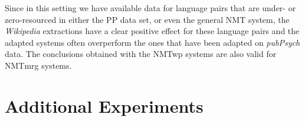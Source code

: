 \documentclass[a4paper,11pt]{article}
\begin{document}
Since in this setting we have available data for language pairs that are under- or zero-resourced in either the PP data set, or even the general NMT system, the \textit{Wikipedia} extractions have a clear positive effect for these language pairs and the adapted systems often overperform the ones that have been adapted on \textit{pubPsych} data. The conclusions obtained with the NMTwp systems are also valid for NMTmrg systems.





\section{Additional Experiments}
\label{s:moreExperiments}
\end{document}
